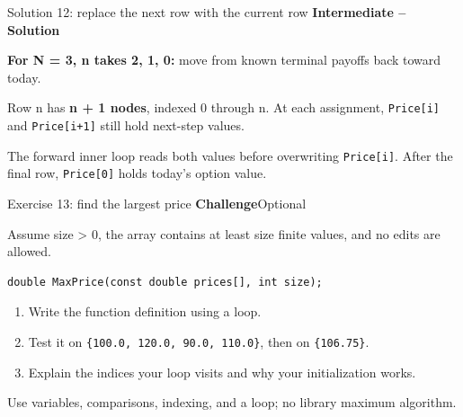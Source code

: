\documentclass[10pt,aspectratio=169]{beamer}
\newcommand{\exerciseinfo}[2]{%
  \textbf{#1}\hfill{\small #2}\par
}
\newcommand{\solutioninfo}[1]{%
  {\color{MatrixGreen!75!black}\textbf{#1 -- Solution}}\par
}
\newcommand{\context}[1]{{\small #1\par}}
\begin{document}
\begin{frame}{Solution 12: replace the next row with the current row}
\relax
\solutioninfo{Intermediate}
\begin{center}
\end{center}
\textbf{For N = 3, n takes 2, 1, 0:} move from known terminal payoffs back toward today.\par
\smallskip
Row n has \textbf{n + 1 nodes}, indexed 0 through n.
At each assignment, \texttt{Price[i]} and \texttt{Price[i+1]} still hold next-step values.\par
\smallskip
{\small The forward inner loop reads both values before overwriting \texttt{Price[i]}.
After the final row, \texttt{Price[0]} holds today's option value.}
\end{frame}

\begin{frame}[fragile]{Exercise 13: find the largest price}
\relax
\exerciseinfo{Challenge}{Optional}
\context{Assume size > 0, the array contains at least size finite values, and no edits are allowed.}
\begin{center}
\begin{minipage}{0.87\textwidth}
\begin{lstlisting}
double MaxPrice(const double prices[], int size);
\end{lstlisting}
\end{minipage}
\end{center}
\begin{enumerate}
\item Write the function definition using a loop.
\item Test it on \texttt{\{100.0, 120.0, 90.0, 110.0\}}, then on \texttt{\{106.75\}}.
\item Explain the indices your loop visits and why your initialization works.
\end{enumerate}
\smallskip
{\small Use variables, comparisons, indexing, and a loop; no library maximum algorithm.}
\end{frame}
\end{document}
